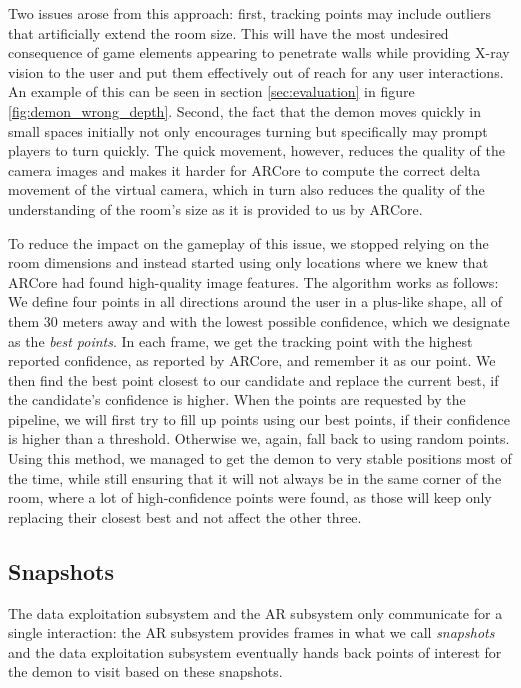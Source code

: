 Two issues arose from this approach: first, tracking points may include outliers that artificially extend the room size.
This will have the most undesired consequence of game elements appearing to penetrate walls while providing X-ray vision to the user and put them effectively out of reach for any user interactions. An example of this can be seen in section \ref{sec:evaluation} in figure \ref{fig:demon_wrong_depth}.
Second, the fact that the demon moves quickly in small spaces initially not only encourages turning but specifically may prompt players to turn quickly.
The quick movement, however, reduces the quality of the camera images and makes it harder for ARCore to compute the correct delta movement of the virtual camera, which in turn also reduces the quality of the understanding of the room's size as it is provided to us by ARCore.

To reduce the impact on the gameplay of this issue, we stopped relying on the room dimensions and instead started using only locations where we knew that ARCore had found high-quality image features.
The algorithm works as follows: We define four points in all directions around the user in a plus-like shape, all of them 30 meters away and with the lowest possible confidence, which we designate as the \emph{best points}.
In each frame, we get the tracking point with the highest reported confidence, as reported by ARCore, and remember it as our \emphcandidate point.
We then find the best point closest to our candidate and replace the current best, if the candidate's confidence is higher.
When the points are requested by the pipeline, we will first try to fill up points using our best points, if their confidence is higher than a threshold.
Otherwise we, again, fall back to using random points.
Using this method, we managed to get the demon to very stable positions most of the time, while still ensuring that it will not always be in the same corner of the room, where a lot of high-confidence points were found, as those will keep only replacing their closest best and not affect the other three.

\subsection{Snapshots}
The data exploitation subsystem and the AR subsystem only communicate for a single interaction: the AR subsystem provides frames in what we call \emph{snapshots} and the data exploitation subsystem eventually hands back points of interest for the demon to visit based on these snapshots.

